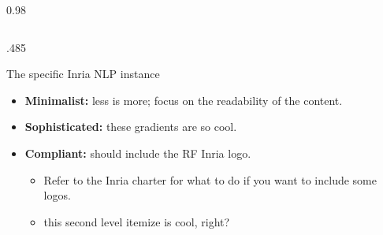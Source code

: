 \documentclass[final,svgnames,english]{beamer}
\begin{document}
\begin{frame}[fragile]{}
\begin{columns}[T]
\begin{column}{0.98\linewidth}
\begin{columns}[T]
\begin{column}{.485\linewidth}
          \begin{plainblock}{}
            \centering
            
          \end{plainblock}

          \begin{inriablock}{The specific Inria NLP instance}
            \begin{itemize}
              \item \textbf{Minimalist:} less is more; focus on the readability of the content.
              \item \textbf{Sophisticated:} these gradients are so cool.
              \item \textbf{Compliant:} should include the RF Inria logo.
                \begin{itemize}
                  \item Refer to the Inria charter for what to do if you want to include some logos.
                  \item this second level itemize is cool, right?
                \end{itemize}
            \end{itemize}
          \end{inriablock}


\end{column}
\end{columns}
\end{column}
\end{columns}
\end{frame}
\end{document}
